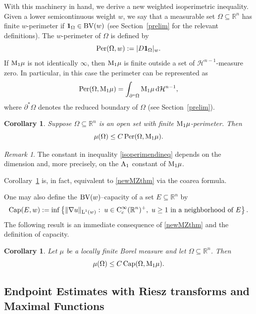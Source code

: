 \documentclass[11pt, a4paper, reqno]{amsart}
\newcommand{\A}{\textup A}
\newcommand{\Lup}{\textup{L}}
\newcommand{\BV}{\textup{BV}}
\newcommand{\Con}{\textup{C}}
\DeclareMathOperator{\Per}{\textup{Per}}
\newtheorem{corollary}[theorem]{Corollary}
\theoremstyle{definition}
\theoremstyle{remark}
\newtheorem{remark}[theorem]{Remark}
\begin{document}
With this machinery in hand, we derive a new weighted isoperimetric inequality.  Given a lower semicontinuous weight $w$, we say that a measurable set 
$\Omega \subseteq \mathbb{R}^{n}$ has finite $w$-perimeter if 
$\mathbf{1}_{\Omega} \in \BV(w)$ (see Section~\ref{prelim} for the relevant definitions). 
The $w$-perimeter of $\Omega$ is defined by
\[
\Per(\Omega,w) := |D\mathbf 1_\Omega|_{w}.
\]
If $\textup M_1\mu$ is not identically $\infty$, then $\textup M_1\mu$ is finite outside a set of $\mathcal H^{n-1}$-measure zero. In particular, in this case the perimeter can be represented as
\[
\Per(\Omega,\textup M_1\mu)
=\int_{\partial^*\Omega} \textup M_1\mu \,\mathrm d\mathcal H^{n-1},
\]
where $\partial^*\Omega$ denotes the reduced boundary of $\Omega$ (see Section~\ref{prelim}).

\begin{corollary}\label{isoperimend}
Suppose $\Omega \subseteq \mathbb{R}^{n}$ is an open set with finite $\textup{M}_{1}\mu$-perimeter. 
Then
\begin{equation*}\label{isoperimendineq}
\mu(\Omega) \le C \Per(\Omega,\textup{M}_{1}\mu).
\end{equation*}
\end{corollary}
\begin{remark}
The constant in inequality \eqref{isoperimendineq} depends on the dimension and, more precisely, on the $\A_1$ constant of $\textup{M}_1\mu$.\end{remark}
\noindent
Corollary~\ref{isoperimend} is, in fact, equivalent to \eqref{newMZthm} via the coarea formula.

\medskip

One may also define the $\BV(w)$--capacity of a set $E \subseteq \mathbb{R}^{n}$ by
\[
\textup{Cap}(E,w)
:= \inf \left\{
\|\nabla u\|_{\Lup^{1}(w)}
:\;
u \in \Con_c^{\infty}(\mathbb{R}^{n})^{+},\ 
u \ge 1 \text{ in a neighborhood of } E
\right\}.
\]
\noindent The following result is an immediate consequence of \eqref{newMZthm} and the definition of capacity.

\begin{corollary}\label{capacity}
Let $\mu$ be a locally finite Borel measure and 
let $\Omega \subseteq \mathbb{R}^{n}$. 
Then
\begin{equation*}\label{capacityineq}
\mu(\Omega) \le C\, \textup{Cap}(\Omega,\textup{M}_{1}\mu).
\end{equation*}
\end{corollary}

\subsection{Endpoint Estimates with Riesz transforms and Maximal Functions}
\end{document}
